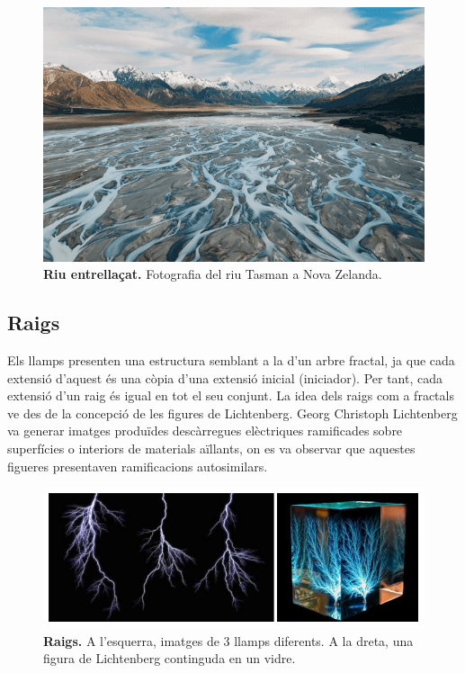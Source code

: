 \documentclass[12pt,a4paper]{report}
\begin{document}
\begin{figure}[!ht]
\centering
\includegraphics[scale=0.7]{img/img04_02_braided.png}
\caption{\textbf{Riu entrellaçat.} Fotografia del riu Tasman a Nova Zelanda.}
\end{figure}
\newpage
\subsection{Raigs}
Els llamps presenten una estructura semblant a la d'un arbre fractal, ja que cada extensió d'aquest és una còpia d'una extensió inicial (iniciador). Per tant, cada extensió d'un raig és igual en tot el seu conjunt. La idea dels raigs com a fractals ve des de la concepció de les figures de Lichtenberg. Georg Christoph Lichtenberg va generar imatges produïdes descàrregues elèctriques ramificades sobre superfícies o interiors de materials aïllants, on es va observar que aquestes figueres presentaven ramificacions autosimilars. 
\begin{figure}[!ht]
\centering
\includegraphics[scale=1]{img/img04_rayos.pdf}
\caption{\textbf{Raigs.} A l'esquerra, imatges de 3 llamps diferents. A la dreta, una figura de Lichtenberg continguda en un vidre.}
\end{figure}
\end{document}
